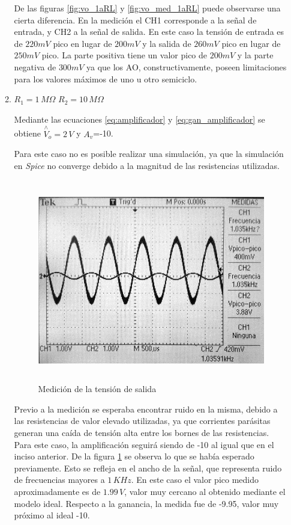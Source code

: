 \documentclass[10pt,spanish,a4paper,openany,notitlepage]{article}
\begin{document}
\begin{enumerate}
\begin{enumerate}
    
    De las figuras \ref{fig:vo_1aRL} y \ref{fig:vo_med_1aRL} puede observarse una cierta diferencia. En la medición el CH1 corresponde a la señal de entrada, y CH2 a la señal de salida. En este caso la tensión de entrada es de $220\unit{mV}$ pico en lugar de $200\unit{mV}$ y la salida de $260\unit{mV}$ pico en lugar de $250\unit{mV}$ pico. La parte positiva tiene un valor pico de $200\unit{mV}$ y la parte negativa de $300\unit{mV}$ ya que los AO, constructivamente, poseen limitaciones para los valores máximos de uno u otro semiciclo. \\
    
    \item $R_1 = 1\,\unit{M\Omega}$ $R_2 = 10\,\unit{M\Omega}$
    
    Mediante las ecuaciones \ref{eq:amplificador} y \ref{eq:gan_amplificador} se obtiene $\overset{\wedge}{V}_o = 2\,\unit{V}$ y $A_v$=-10.
    
    Para este caso no es posible realizar una simulación, ya que la simulación en \emph{Spice} no converge
    debido a la magnitud de las resistencias utilizadas.
    
    \begin{figure}[H]
    \centering
    \includegraphics[width=350pt, height=250pt]{mediciones/A1b.jpg}
    \caption{Medición de la tensión de salida}
    \label{fig:vo_med_1b}
    \end{figure}

    Previo a la medición se esperaba encontrar ruido en la misma, debido a las resistencias
    de valor elevado utilizadas, ya que corrientes parásitas generan una caída de tensión
    alta entre los bornes de las resistencias. Para este caso, la amplificación seguirá
    siendo de -10 al igual que en el inciso anterior. De la figura \ref{fig:vo_med_1b} se
    observa lo que se había esperado previamente. Esto se refleja en el ancho de la señal, que representa ruido de frecuencias mayores a $1\,\unit{KHz}$. En este caso el valor pico medido aproximadamente es de $1.99\,\unit{V}$, valor muy cercano al obtenido mediante el modelo ideal. Respecto a la ganancia, la medida fue de -9.95, valor muy próximo al ideal -10. \\


\end{enumerate}
\end{enumerate}
\end{document}
